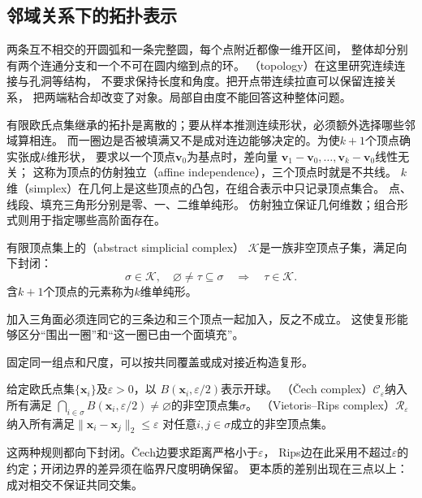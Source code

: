\subsection{邻域关系下的拓扑表示}
\label{sec:geometry-local-relations-topology}

两条互不相交的开圆弧和一条完整圆，每个点附近都像一维开区间，
整体却分别有两个连通分支和一个不可在圆内缩到点的环。
（topology）在这里研究连续连接与孔洞等结构，
不要求保持长度和角度。把开点带连续拉直可以保留连接关系，
把两端粘合却改变了对象。局部自由度不能回答这种整体问题。

有限欧氏点集继承的拓扑是离散的；要从样本推测连续形状，必须额外选择哪些邻域算相连。
而一圈边是否被填满又不是成对连边能够决定的。为使$k+1$个顶点确实张成$k$维形状，
要求以一个顶点$\bm v_0$为基点时，差向量
$\bm v_1-\bm v_0,\ldots,\bm v_k-\bm v_0$线性无关；
这称为顶点的仿射独立（affine independence），三个顶点时就是不共线。
$k$维（simplex）在几何上是这些顶点的凸包，在组合表示中只记录顶点集合。
点、线段、填充三角形分别是零、一、二维单纯形。
仿射独立保证几何维数；组合形式则用于指定哪些高阶面存在。

\begin{definition}[抽象单纯复形]
\label{def:geometry-simplicial-complex}
有限顶点集上的（abstract simplicial complex）
$\mathcal K$是一族非空顶点子集，满足向下封闭：
\begin{equation}
 \sigma\in\mathcal K,\quad\varnothing\neq\tau\subseteq\sigma
 \quad\Longrightarrow\quad\tau\in\mathcal K.
 \label{eq:geometry-simplicial-complex-closure}
\end{equation}
含$k+1$个顶点的元素称为$k$维单纯形。
\end{definition}
加入三角面必须连同它的三条边和三个顶点一起加入，反之不成立。
这使复形能够区分“围出一圈”和“这一圈已由一个面填充”。

固定同一组点和尺度，可以按共同覆盖或成对接近构造复形。
\begin{definition}
\label{def:geometry-cech-rips-complexes}
给定欧氏点集$\{\bm x_i\}$及$\varepsilon>0$，以
$B(\bm x_i,\varepsilon/2)$表示开球。
（Čech complex）$\mathcal C_\varepsilon$纳入所有满足
$\bigcap_{i\in\sigma}B(\bm x_i,\varepsilon/2)\neq\varnothing$的非空顶点集$\sigma$。
（Vietoris--Rips complex）$\mathcal R_\varepsilon$
纳入所有满足$\lVert\bm x_i-\bm x_j\rVert_2\leq\varepsilon$
对任意$i,j\in\sigma$成立的非空顶点集。
\end{definition}
这两种规则都向下封闭。Čech边要求距离严格小于$\varepsilon$，
Rips边在此采用不超过$\varepsilon$的约定；开闭边界的差异须在临界尺度明确保留。
更本质的差别出现在三点以上：成对相交不保证共同交集。

